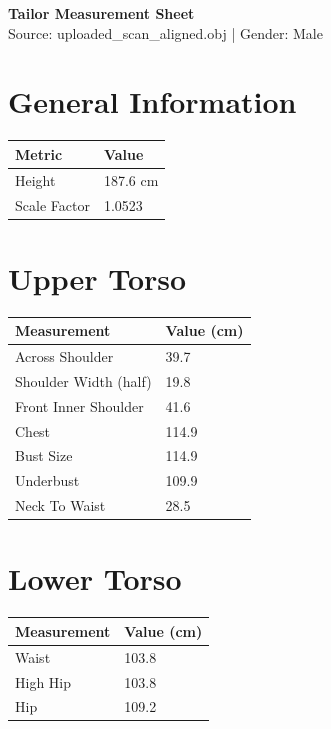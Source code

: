 \documentclass[11pt,a4paper]{article}
\begin{document}
\begin{center}
    {\Huge \textbf{Tailor Measurement Sheet}} \\
    \vspace{2mm}
    {\large Source: uploaded\_scan\_aligned.obj \quad | \quad Gender: Male}
\end{center}

\section*{General Information}
\begin{tabular}{p{4cm} p{4cm}}
    \textbf{Metric} & \textbf{Value} \\
    \midrule
    Height & 187.6 cm \\
    Scale Factor & 1.0523 \\
\end{tabular}

\section*{Upper Torso}
\begin{tabular}{p{4cm} p{4cm}}
    \textbf{Measurement} & \textbf{Value (cm)} \\
    \midrule
    Across Shoulder & 39.7 \\
    Shoulder Width (half)& 19.8 \\
    Front Inner Shoulder & 41.6 \\
    Chest & 114.9 \\
    Bust Size & 114.9 \\
    Underbust & 109.9 \\
    Neck To Waist & 28.5 \\
\end{tabular}

\section*{Lower Torso}
\begin{tabular}{p{4cm} p{4cm}}
    \textbf{Measurement} & \textbf{Value (cm)} \\
    \midrule
    Waist & 103.8 \\
    High Hip & 103.8 \\
    Hip & 109.2 \\
\end{tabular}
\end{document}
